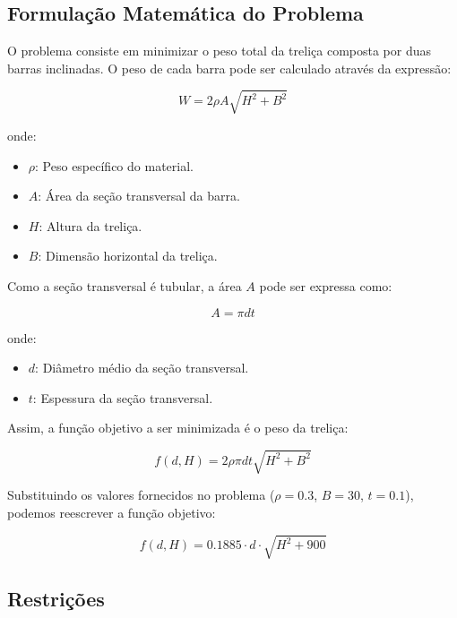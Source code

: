 \documentclass[a4paper, 12pt]{article}
\begin{document}
\subsection{Formulação Matemática do Problema}

O problema consiste em minimizar o peso total da treliça composta por duas barras inclinadas. O peso de cada barra pode ser calculado através da expressão:

\begin{equation}
    W = 2 \rho A \sqrt{H^2 + B^2}
\end{equation}

onde:
\begin{itemize}
    \item \(\rho\): Peso específico do material.
    \item \(A\): Área da seção transversal da barra.
    \item \(H\): Altura da treliça.
    \item \(B\): Dimensão horizontal da treliça.
\end{itemize}

Como a seção transversal é tubular, a área \(A\) pode ser expressa como:

\begin{equation}
    A = \pi d t
\end{equation}

onde:
\begin{itemize}
    \item \(d\): Diâmetro médio da seção transversal.
    \item \(t\): Espessura da seção transversal.
\end{itemize}

Assim, a função objetivo a ser minimizada é o peso da treliça:

\begin{equation}
    f(d, H) = 2 \rho \pi d t \sqrt{H^2 + B^2}
\end{equation}

Substituindo os valores fornecidos no problema (\(\rho = 0.3\), \(B = 30\), \(t = 0.1\)), podemos reescrever a função objetivo:

\begin{equation}
    f(d, H) = 0.1885 \cdot d \cdot \sqrt{H^2 + 900}
\end{equation}

\subsection{Restrições}
\end{document}
